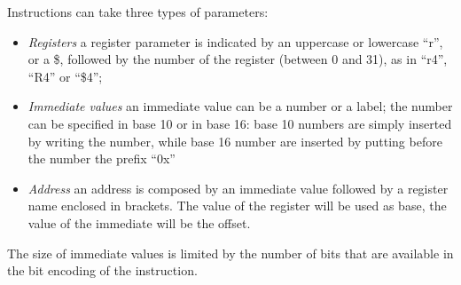 \documentclass[letterpaper,10pt,english]{sphinxmanual}
\begin{document}
Instructions can take three types of parameters:
\begin{itemize}
\item {} 
\emph{Registers} a register parameter is indicated by an uppercase
or lowercase ``r'', or a \$, followed by the number of the register (between
0 and 31), as in ``r4'', ``R4'' or ``\$4'';

\item {} 
\emph{Immediate values} an immediate value can be a number or a
label; the number can be specified in base 10 or in base 16: base 10 numbers
are simply inserted by writing the number, while base 16 number are inserted
by putting before the number the prefix ``0x''

\item {} 
\emph{Address} an address is composed by an immediate value followed
by a register name enclosed in brackets. The value of the register will be
used as base, the value of the immediate will be the offset.

\end{itemize}

The size of immediate values is limited by the number of bits that are available
in the bit encoding of the instruction.
\end{document}
